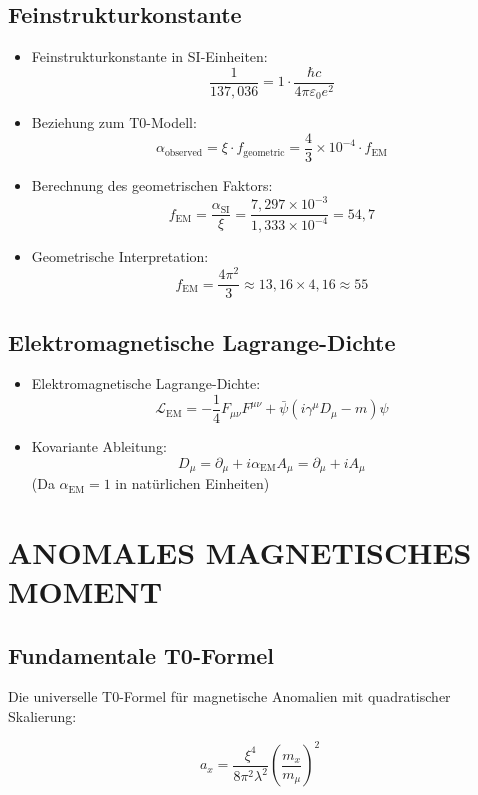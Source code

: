	\subsection{Feinstrukturkonstante}
	\begin{itemize}
		\item Feinstrukturkonstante in SI-Einheiten:
		$$\frac{1}{137{,}036} = 1 \cdot \frac{\hbar c}{4\pi\varepsilon_0 e^2}$$
		
		\item Beziehung zum T0-Modell:
		$$\alpha_{\text{observed}} = \xi \cdot f_{\text{geometric}} = \frac{4}{3} \times 10^{-4} \cdot f_{\text{EM}}$$
		
		\item Berechnung des geometrischen Faktors:
		$$f_{\text{EM}} = \frac{\alpha_{\text{SI}}}{\xi} = \frac{7{,}297 \times 10^{-3}}{1{,}333 \times 10^{-4}} = 54{,}7$$
		
		\item Geometrische Interpretation:
		$$f_{\text{EM}} = \frac{4\pi^2}{3} \approx 13{,}16 \times 4{,}16 \approx 55$$
	\end{itemize}
	
	\subsection{Elektromagnetische Lagrange-Dichte}
	\begin{itemize}
		\item Elektromagnetische Lagrange-Dichte:
		$$\mathcal{L}_{\text{EM}} = -\frac{1}{4}F_{\mu\nu}F^{\mu\nu} + \bar{\psi}(i\gamma^\mu D_\mu - m)\psi$$
		
		\item Kovariante Ableitung:
		$$D_\mu = \partial_\mu + i \alpha_{\text{EM}} A_\mu = \partial_\mu + i A_\mu$$
		(Da $\alpha_{\text{EM}} = 1$ in natürlichen Einheiten)
	\end{itemize}
	
	\section{ANOMALES MAGNETISCHES MOMENT}
	
	\subsection{Fundamentale T0-Formel}
	
	Die universelle T0-Formel für magnetische Anomalien mit quadratischer Skalierung:
	
	\begin{equation}
		\boxed{a_x = \frac{\xi^4}{8\pi^2 \lambda^2} \left(\frac{m_x}{m_\mu}\right)^2}
	\end{equation}
	
